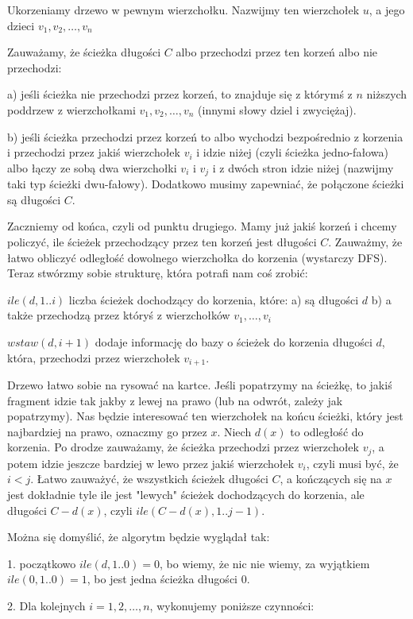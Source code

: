 Ukorzeniamy drzewo w pewnym wierzchołku. Nazwijmy ten wierzchołek $u$, a jego dzieci $v_1, v_2, \ldots , v_n$

Zauważamy, że ścieżka długości $C$ albo przechodzi przez ten korzeń albo nie przechodzi:

a) jeśli ścieżka nie przechodzi przez korzeń, to znajduje się z którymś z $n$ niższych poddrzew z wierzchołkami $v_1, v_2, \ldots, v_n$ (innymi słowy dziel i zwyciężaj).

b) jeśli ścieżka przechodzi przez korzeń to albo wychodzi bezpośrednio z korzenia i przechodzi przez jakiś wierzchołek $v_i$ i idzie niżej (czyli ścieżka jedno-fałowa) albo łączy ze sobą dwa wierzchołki $v_i$ i $v_j$ i z dwóch stron idzie niżej (nazwijmy taki typ ścieżki dwu-fałowy). Dodatkowo musimy zapewniać, że połączone ścieżki są długości $C$.


Zaczniemy od końca, czyli od punktu drugiego. Mamy już jakiś korzeń i chcemy policzyć, ile ścieżek przechodzący przez ten korzeń jest długości $C$. Zauważmy, że łatwo obliczyć odległość dowolnego wierzchołka do korzenia (wystarczy DFS). Teraz stwórzmy sobie strukturę, która potrafi nam coś zrobić:

$ile(d, 1..i) $ liczba ścieżek dochodzący do korzenia, które:
a) są długości $d$
b) a także przechodzą przez któryś z wierzchołków $v_1, \ldots, v_i$

$wstaw(d, i+1) $ dodaje informację do bazy o ścieżek do korzenia długości $d$, która, przechodzi przez wierzchołek $v_{i+1}$.

Drzewo łatwo sobie na rysować na kartce. Jeśli popatrzymy na ścieżkę, to jakiś fragment idzie tak jakby z lewej na prawo (lub na odwrót, zależy jak popatrzymy). Nas będzie interesować ten wierzchołek na końcu ścieżki, który jest najbardziej na prawo, oznaczmy go przez $x$. Niech $d(x)$ to odległość do korzenia. Po drodze zauważamy, że ścieżka przechodzi przez wierzchołek $v_j$, a potem idzie jeszcze bardziej w lewo przez jakiś wierzchołek $v_i$, czyli musi być, że $i<j$. Łatwo zauważyć, że wszystkich ścieżek długości $C$, a kończących się na $x$ jest dokładnie
tyle ile jest "lewych" ścieżek dochodzących do korzenia, ale długości $C-d(x)$, czyli
$ile(C - d(x), 1..j-1)$.

Można się domyślić, że algorytm będzie wyglądał tak:

1. początkowo $ile(d, 1..0) = 0$, bo wiemy, że nic nie wiemy, za wyjątkiem $ile(0, 1..0) = 1$, bo jest jedna ścieżka długości $0$.

2. Dla kolejnych $i = 1, 2, \ldots, n$, wykonujemy poniższe czynności:

